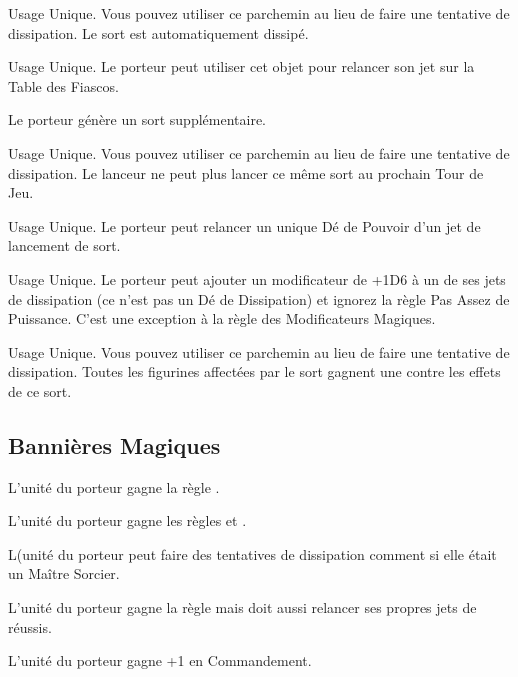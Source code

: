 Usage Unique. Vous pouvez utiliser ce parchemin au lieu de faire une tentative de dissipation. Le sort est automatiquement dissipé.

Usage Unique. Le porteur peut utiliser cet objet pour relancer son jet sur la Table des Fiascos.

Le porteur génère un sort supplémentaire.

Usage Unique. Vous pouvez utiliser ce parchemin au lieu de faire une tentative de dissipation. Le lanceur ne peut plus lancer ce même sort au prochain Tour de Jeu.

Usage Unique. Le porteur peut relancer un unique Dé de Pouvoir d'un jet de lancement de sort.

Usage Unique. Le porteur peut ajouter un modificateur de +1D6 à un de ses jets de dissipation (ce n'est pas un Dé de Dissipation) et ignorez la règle Pas Assez de Puissance. C'est une exception à la règle des Modificateurs Magiques.

Usage Unique. Vous pouvez utiliser ce parchemin au lieu de faire une tentative de dissipation. Toutes les figurines affectées par le sort gagnent une  contre les effets de ce sort.

\endpricelist

\newpage
\hypertarget{magicalstandards}{\subsection{Bannières Magiques}}
\label{magical_standards}

\startpricelist

L'unité du porteur gagne la règle .

L'unité du porteur gagne les règles \swiftstride{} et \strider{}.

L(unité du porteur peut faire des tentatives de dissipation comment si elle était un Maître Sorcier.

L'unité du porteur gagne la règle \divineattacks{} mais doit aussi relancer ses propres jets de \wardsave{} réussis.

L'unité du porteur gagne +1 en Commandement.

